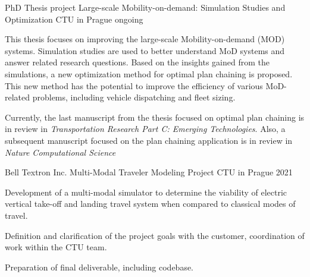 

\begin{cventries}

  \cventry
    {PhD Thesis project} %
    {Large-scale Mobility-on-demand: Simulation Studies and Optimization} %
    {CTU in Prague} %
    {ongoing} %
    {
      \begin{cvitems} %
        \item {This thesis focuses on improving the large-scale Mobility-on-demand (MOD) systems.  
        Simulation studies are used to better understand MoD systems and answer related research questions. 
        Based on the insights gained from the simulations, a new optimization method for optimal plan chaining is proposed.
        This new method has the potential to improve the efficiency of various MoD-related problems, including vehicle dispatching and fleet sizing.
        }
        \item {Currently, the last manuscript from the thesis focused on optimal plan chaining is in review in \emph{Transportation Research Part C: Emerging Technologies}.
        Also, a subsequent manuscript focused on the plan chaining application is in review in \emph{Nature Computational Science}
        }
      \end{cvitems}
    }

    

  \cventry
    {Bell Textron Inc. Multi-Modal Traveler Modeling Project} %
    {
    } %
    {CTU in Prague} %
    {2021} %
    {
      \begin{cvitems} %
        \item {Development of a multi-modal simulator to determine the viability of electric vertical take-off and landing travel system when compared to classical modes of travel.}
        \item {Definition and clarification of the project goals with the customer, coordination of work within the CTU team.}
        \item {Preparation of final deliverable, including codebase. }
      \end{cvitems}
    }
\end{cventries}


